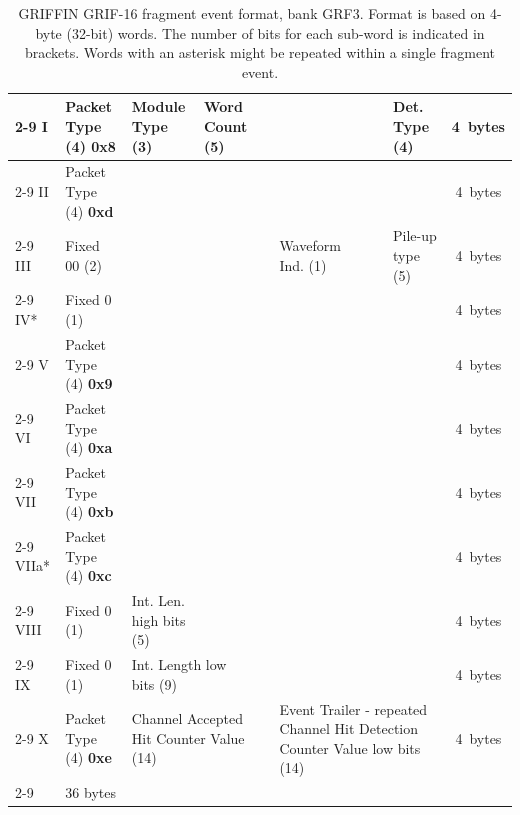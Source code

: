 \documentclass[letterpaper,12pt,notitlepage]{report}
\begin{document}
\begin{landscape}
\begin{table}
\caption{GRIFFIN GRIF-16 fragment event format, bank GRF3. Format is based on 4-byte (32-bit) words. The number of bits for each sub-word is indicated in brackets. Words with an asterisk might be repeated within a single fragment event.}
\begin{tabular*}{\textwidth}{p{0.9cm}|p{2.25cm}|p{2.2cm}|p{2.2cm}|p{2.2cm}|p{2.2cm}|p{2.2cm}|p{2.2cm}|p{2.2cm}|c}
\cline{2-9}
I& Packet Type (4) {\bf 0x8} & Module Type (3) & Word Count (5) & \multicolumn{4}{p{8.8cm}|}{\centering{Address (16)}} & Det. Type (4) & 4~bytes\\
\cline{2-9}
II & Packet Type (4) {\bf 0xd} & \multicolumn{7}{p{15.4cm}|}{\centering{Network Packet Counter Value (28)}} & 4~bytes\\
\cline{2-9}
III & Fixed 00 (2) & \multicolumn{3}{p{6.6cm}|}{\centering{Filter Patterns (14)}} & Waveform Ind. (1) & \multicolumn{2}{p{4.4cm}|}{\centering{reserved (10)}} & Pile-up type (5) & 4~bytes\\
\cline{2-9}
IV* & Fixed 0 (1) & \multicolumn{7}{p{15.4cm}|}{\centering{Filter Condition Counter Value (31)}} & 4~bytes\\
\cline{2-9}
V & Packet Type (4) {\bf 0x9} & \multicolumn{7}{p{15.4cm}|}{\centering{Channel Hit Detection Counter Value (28)}} & 4~bytes\\
\cline{2-9}
VI & Packet Type (4) {\bf 0xa} & \multicolumn{7}{p{15.4cm}|}{\centering{Time Stamp low bits (28)}} & 4~bytes\\
\cline{2-9}
VII & Packet Type (4) {\bf 0xb} & \multicolumn{3}{p{6.6cm}|}{\centering{Deadtime (14)}} & \multicolumn{4}{p{8.8cm}|}{\centering{Time Stamp high bits (14)}} & 4~bytes\\
\cline{2-9}
VIIa* & Packet Type (4) {\bf 0xc} & \multicolumn{7}{p{15.4cm}|}{\centering{Waveform Sample (28)}} & 4~bytes\\
\cline{2-9}
VIII & Fixed 0 (1) & Int. Len. high bits (5) & \multicolumn{6}{p{13.2cm}|}{\centering{Pulse Height (26)}} & 4~bytes\\
\cline{2-9}
IX & Fixed 0 (1) & \multicolumn{2}{p{4.4cm}|}{Int. Length low bits (9)} & \multicolumn{5}{p{11.0cm}|}{\centering{CFD (22)}} & 4~bytes\\
\cline{2-9}
X & Packet Type (4) {\bf 0xe} & \multicolumn{3}{p{6.6cm}|}{Channel Accepted Hit Counter Value (14)} & \multicolumn{4}{p{8.8cm}|}{Event Trailer - repeated Channel Hit Detection Counter Value low bits (14)} & 4~bytes\\
\cline{2-9}
\multicolumn{9}{r}{Total one hit:} & 36 bytes\\
\end{tabular*}
\end{table}

\end{landscape}
\end{document}
